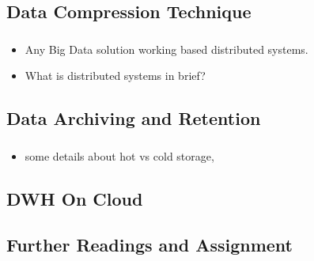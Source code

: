 \subsection{Data Compression Technique}

\begin{frame}
\frametitle{\subsecname}
\begin{itemize}[<+->]
\item Any Big Data solution working based distributed systems.
\item What is distributed systems in brief?
\end{itemize}
\end{frame}

\subsection{Data Archiving and Retention}
\begin{frame}
\frametitle{\subsecname}
\begin{itemize}[<+->]
	\item some details about hot vs cold storage,
\end{itemize}
\end{frame}


\subsection{DWH On Cloud}



\subsection{Further Readings and Assignment}


